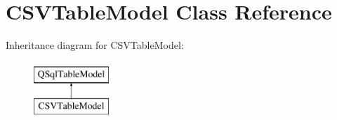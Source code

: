 \hypertarget{class_c_s_v_table_model}{}\section{C\+S\+V\+Table\+Model Class Reference}
\label{class_c_s_v_table_model}
Inheritance diagram for C\+S\+V\+Table\+Model\+:\begin{figure}[H]
\begin{center}
\leavevmode
\includegraphics[height=2.000000cm]{class_c_s_v_table_model}
\end{center}
\end{figure}
